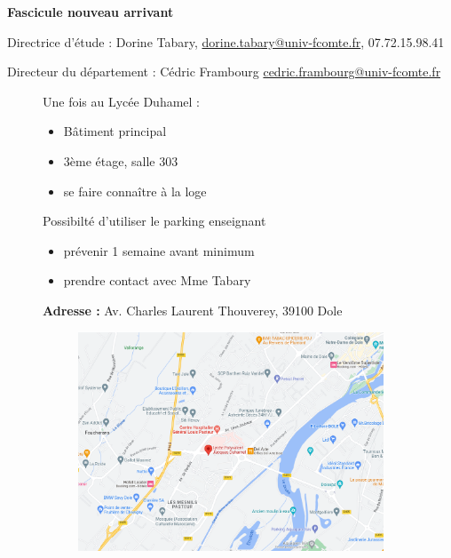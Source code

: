 \documentclass[10pt, a4paper]{article}
\begin{document}
\begin{titlepage}
    \begin{center}
            
        \huge
        \textbf{Fascicule nouveau arrivant}
    \normalsize
\begin{tcolorbox}[lefttitle=2cm, colframe=gray!75!black, title= \textbf{Vos contacts}]
Directrice d'étude : Dorine Tabary, \url{dorine.tabary@univ-fcomte.fr}, 07.72.15.98.41

Directeur du département : Cédric Frambourg \url{cedric.frambourg@univ-fcomte.fr}

\end{tcolorbox}
        
\begin{tcolorbox}[lefttitle=2cm, colframe=gray!75!black, title= \textbf{Accéder au lycée Duhamel}]

\begin{figure}[H]
\begin{minipage}[t]{0.4\textwidth}
Une fois au Lycée Duhamel :
\begin{itemize}
    \item Bâtiment principal
    \item 3ème étage, salle 303
    \item se faire connaître à la loge 
\end{itemize}

Possibilté d'utiliser le parking enseignant
\begin{itemize}
    \item prévenir 1 semaine avant minimum
    \item prendre contact avec Mme Tabary 
\end{itemize}
\end{minipage}\hfill
\begin{minipage}[t]{0.55\textwidth}
\textbf{Adresse :}
Av. Charles Laurent Thouverey, 
39100 Dole
\begin{figure}
    \centering
    \includegraphics[scale=0.24]{lyceeDuhamel.png}
\end{figure}
\end{minipage}
\end{figure}
\end{tcolorbox}



\end{center}
\end{titlepage}
\end{document}

